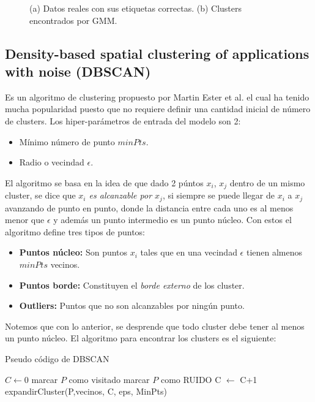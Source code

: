 \begin{figure}[ht]
\begin{subfigure}[t]{0.5\linewidth}
        \caption{}
    \end{subfigure}
    \caption{(a) Datos reales con sus etiquetas correctas. (b) Clusters encontrados por GMM.}
    \label{fig:gmm}
\end{figure}

\subsection{Density-based spatial clustering of applications with noise (DBSCAN)}

Es un algoritmo de clustering propuesto por Martin Ester et al. el cual ha tenido mucha popularidad puesto que no requiere definir una cantidad inicial de número de clusters. Los hiper-parámetros de entrada del modelo son 2:

\begin{itemize}
    \item Mínimo número de punto $minPts$.
    \item Radio o vecindad $\epsilon$.
\end{itemize}

El algoritmo se basa en la idea de que dado 2 púntos $x_i$, $x_j$ dentro de un mismo cluster, se dice que \emph{$x_i$ es alcanzable por $x_j$}, si siempre se puede llegar de $x_i$ a $x_j$ avanzando de punto en punto, donde la distancia entre cada uno es al menos menor que $\epsilon$ y además un punto intermedio es un punto núcleo. Con estos el algoritmo define tres tipos de puntos:

\begin{itemize}
    \item \textbf{Puntos núcleo:} Son puntos $x_i$ tales que en una vecindad $\epsilon$ tienen almenos $minPts$ vecinos.
    \item \textbf{Puntos borde:} Constituyen el \textit{borde externo} de los cluster.
    \item \textbf{Outliers:} Puntos que no son alcanzables por ningún punto.
\end{itemize}

Notemos que con lo anterior, se desprende que todo cluster debe tener al menos un punto núcleo.
El algoritmo para encontrar los clusters es el siguiente:


\begin{algorithm}[ht]
  \caption{Pseudo código de DBSCAN
    \label{DBSCAN}}
  \begin{algorithmic}[1]
      \State $C \gets 0$\;
      \State marcar $P$ como visitado
        \State marcar $P$ como RUIDO
        \Else
        \State C $\gets$ C+1
        \State expandirCluster(P,vecinos, C, eps, MinPts)
        \EndIf
      \EndFor
    \EndFunction
  \end{algorithmic}
\end{algorithm}


